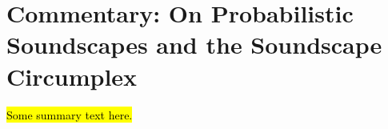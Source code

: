 \documentclass[oneside,fontsize=13pt,titlepage]{scrbook}
\begin{document}


% 



%  


 \chapter[Commentary: Probabilistic Soundscapes]{Commentary: On Probabilistic Soundscapes and the Soundscape Circumplex}

 \hl{Some summary text here.}

 




 




 \backmatter
 \printglossaries

 


\end{document}
